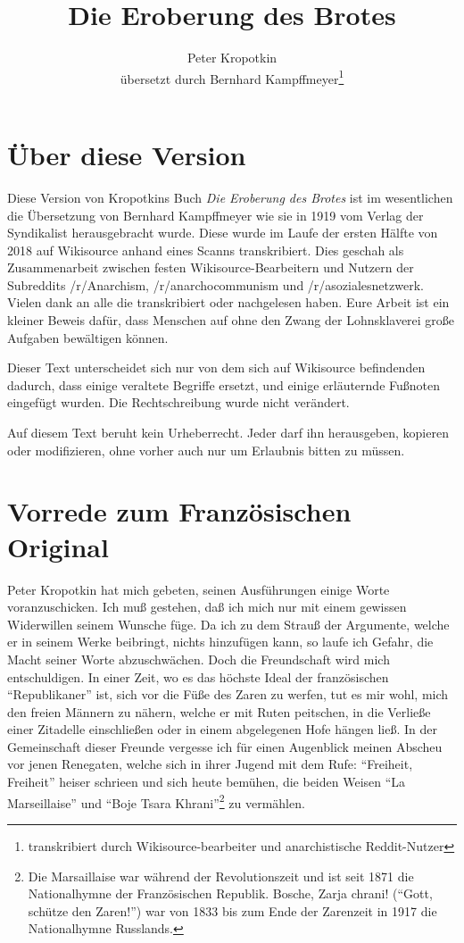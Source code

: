 \documentclass{scrbook}
\title{Die Eroberung des Brotes}
\author{Peter Kropotkin\\ übersetzt durch Bernhard Kampffmeyer\thanks{transkribiert durch Wikisource-bearbeiter und anarchistische Reddit-Nutzer}}
\date{}
\begin{document}
\maketitle

\tableofcontents

\frontmatter
\chapter{Über diese Version}
Diese Version von Kropotkins Buch \textit{Die Eroberung des Brotes} ist im wesentlichen die Übersetzung von Bernhard Kampffmeyer wie sie in 1919 vom Verlag der Syndikalist herausgebracht wurde. Diese wurde im Laufe der ersten Hälfte von 2018 auf Wikisource anhand eines Scanns transkribiert. Dies geschah als Zusammenarbeit zwischen festen Wikisource-Bearbeitern und Nutzern der Subreddits /r/Anarchism, /r/anarchocommunism und /r/asozialesnetzwerk. Vielen dank an alle die transkribiert oder nachgelesen haben. Eure Arbeit ist ein kleiner Beweis dafür, dass Menschen auf ohne den Zwang der Lohnsklaverei große Aufgaben bewältigen können.

Dieser Text unterscheidet sich nur von dem sich auf Wikisource befindenden dadurch, dass einige veraltete Begriffe ersetzt, und einige erläuternde Fußnoten eingefügt wurden. Die Rechtschreibung wurde nicht verändert.

Auf diesem Text beruht kein Urheberrecht. Jeder darf ihn herausgeben, kopieren oder modifizieren, ohne vorher auch nur um Erlaubnis bitten zu müssen.

\chapter{Vorrede zum Französischen Original}
Peter Kropotkin hat mich gebeten, seinen Ausführungen einige Worte voranzuschicken. Ich muß gestehen, daß ich mich nur mit einem gewissen Widerwillen seinem Wunsche füge. Da ich zu dem Strauß der Argumente, welche er in seinem Werke beibringt, nichts hinzufügen kann, so laufe ich Gefahr, die Macht seiner Worte abzuschwächen. Doch die Freundschaft wird mich entschuldigen. In einer Zeit, wo es das höchste Ideal der französischen ``Republikaner'' ist, sich vor die Füße des Zaren zu werfen, tut es mir wohl, mich den freien Männern zu nähern, welche er mit Ruten peitschen, in die Verließe einer Zitadelle einschließen oder in einem abgelegenen Hofe hängen ließ. In der Gemeinschaft dieser Freunde vergesse ich für einen Augenblick meinen Abscheu vor jenen Renegaten, welche sich in ihrer Jugend mit dem Rufe: ``Freiheit, Freiheit'' heiser schrieen und sich heute bemühen, die beiden Weisen ``La Marseillaise'' und ``Boje Tsara Khrani''\footnote{Die Marsaillaise war während der Revolutionszeit und ist seit 1871 die Nationalhymne der Französischen Republik. Bosche, Zarja chrani! (``Gott, schütze den Zaren!'') war von 1833 bis zum Ende der Zarenzeit in 1917 die Nationalhymne Russlands.} zu vermählen.
\end{document}
